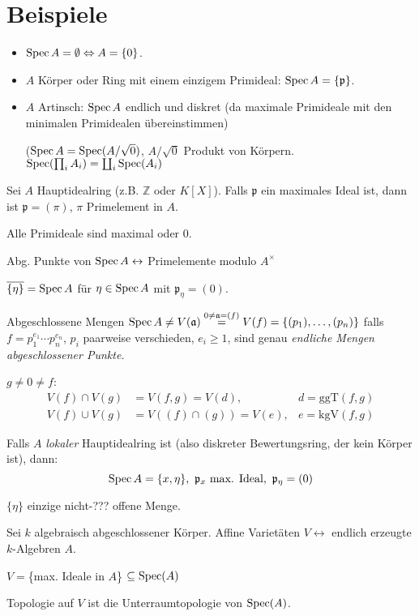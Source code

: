 \section{Beispiele}
\label{sec:beispiele-spektren}
\begin{itemize}
\item $\operatorname{Spec} A=\emptyset\Leftrightarrow A=\{0\}$.
\item $A$ Körper oder Ring mit einem einzigem Primideal: $\operatorname{Spec}
  A=\{\mathfrak{p}\}$.
\item $A$ Artinsch: $\operatorname{Spec} A$ endlich und diskret (da maximale
  Primideale mit den minimalen Primidealen übereinstimmen)

  ($\operatorname{Spec} A=\operatorname{Spec}(A/\sqrt{0})$, $A/\sqrt{0}$ Produkt von Körpern.
  $\operatorname{Spec}(\prod_{i} A_{i})=\coprod_{i}\operatorname{Spec}(A_{i})$
\end{itemize}

\begin{example}
\label{bsp:spec-von-hauptidealring}	
  Sei $A$ Hauptidealring (z.B. $\mathbb{Z}$ oder $K[X]$). Falls
  $\mathfrak{p}$ ein maximales Ideal ist, dann ist
  $\mathfrak{p}=(\pi)$, $\pi$ Primelement in $A$.

  Alle Primideale sind maximal oder 0.

  Abg. Punkte von $\operatorname{Spec} A\leftrightarrow$ Primelemente modulo $A^{\times}$

  $\overline{\{\eta\}}=\operatorname{Spec} A$ für $\eta\in\operatorname{Spec} A$ mit $\mathfrak{p}_{\eta}=(0)$.

  Abgeschlossene Mengen $\operatorname{Spec} A\neq
  V(\mathfrak{a})\overset{0\neq\mathfrak{a}=(f)}{=}V(f)=\{(p_{1}),\ldots,(p_{n})\}$
  falls $f=p_{1}^{e_{1}}\cdots p_{n}^{e_{n}}$, $p_{i}$ paarweise
  verschieden, $e_{i}\geq1$, sind genau \emph{endliche Mengen abgeschlossener Punkte.}

  $g\neq0\neq f$:
  \begin{align*}
    V(f)\cap V(g) & =V(f,g)=V(d), & d=\text{ggT}(f,g)\\
    V(f)\cup V(g) & =V((f)\cap(g))=V(e), & e=\text{kgV}(f,g)
  \end{align*}

  Falls $A$ \emph{lokaler} Hauptidealring ist (also diskreter
  Bewertungsring, der kein Körper ist), dann:
  \[
    \operatorname{Spec} A=\{x,\eta\},\ \mathfrak{p}_{x}\text{ max. Ideal},\
    \mathfrak{p}_{\eta}=(0)
  \]

  $\{\eta\}$ einzige nicht-???  offene Menge.
\end{example}
 
\begin{example}
\label{bsp:zusammenhang-affine-varietaeten}	
  Sei $k$ algebraisch abgeschlossener Körper. Affine Varietäten
  $V\leftrightarrow$ endlich erzeugte $k$-Algebren $A$.

  $V=$\{max. Ideale in $A$\} $\subseteq\operatorname{Spec}(A)$

  Topologie auf $V$ ist die Unterraumtopologie von $\operatorname{Spec}(A)$.
\end{example}
 

